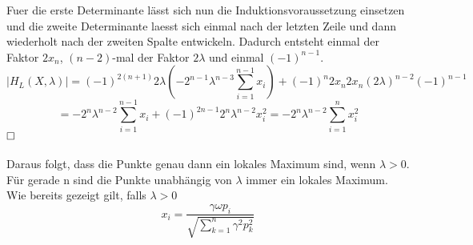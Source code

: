 \documentclass[11pt]{scrartcl}
\begin{document}
			Fuer die erste Determinante lässt sich nun die Induktionsvoraussetzung einsetzen und die zweite Determinante laesst sich einmal nach der letzten Zeile und dann wiederholt nach der zweiten Spalte entwickeln. Dadurch entsteht einmal der Faktor \(2x_{n}\), \((n-2)\)-mal der Faktor \(2\lambda\) und einmal \((-1)^{n-1}\).
			$$
			|H_{L}(X,\lambda)|=(-1)^{2(n+1)}2\lambda(-2^{n-1}\lambda^{n-3}\sum_{i=1}^{n-1}x_{i})+(-1)^{n}2x_{n}2x_{n}(2\lambda)^{n-2}(-1)^{n-1}
			$$
			$$
			=-2^{n}\lambda^{n-2}\sum_{i=1}^{n-1}x_{i}+(-1)^{2n-1}2^{n}\lambda^{n-2}x_{i}^{2}
			=-2^n\lambda^{n-2}\sum_{i=1}^{n}x_{i}^2
			$$
			$\hfill\square$\\\\
			Daraus folgt, dass die Punkte genau dann ein lokales Maximum sind, wenn \(\lambda>0\). Für gerade n sind die Punkte unabhängig von \(\lambda\) immer ein lokales Maximum. Wie bereits gezeigt gilt, falls \(\lambda>0\)
			$$
			x_{i}=\frac{\gamma\omega p_{i}}{\sqrt{\sum_{k=1}^{n}\gamma^2p_{k}^2}}
			$$
\end{document}
